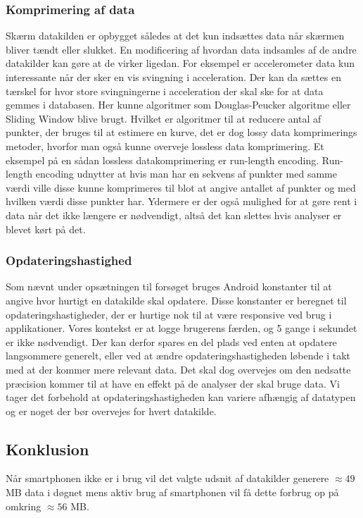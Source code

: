 \subsubsection{Komprimering af data}\label{sec:opryd}
Skærm datakilden er opbygget således at det kun indsættes data når skærmen bliver tændt eller slukket.
En modificering af hvordan data indsamles af de andre datakilder kan gøre at de virker ligedan. 
For eksempel er accelerometer data kun interessante når der sker en vis svingning i acceleration.
Der kan da sættes en tærskel for hvor store svingningerne i acceleration der skal ske for at data gemmes i databasen.
Her kunne algoritmer som Douglas-Peucker algoritme eller Sliding Window blive brugt.
Hvilket er algoritmer til at reducere antal af punkter, der bruges til at estimere en kurve, det er dog lossy data komprimerings metoder, hvorfor man også kunne overveje lossless data komprimering.
Et eksempel på en sådan lossless datakomprimering er run-length encoding\cite{misc:rle}.
Run-length encoding udnytter at hvis man har en sekvens af punkter med samme værdi ville disse kunne komprimeres til blot at angive antallet af punkter og med hvilken værdi disse punkter har.
Ydermere er der også mulighed for at gøre rent i data når det ikke længere er nødvendigt, altså det kan slettes hvis analyser er blevet kørt på det.

\subsubsection{Opdateringshastighed}
Som nævnt under opsætningen til forsøget bruges Android konstanter til at angive hvor hurtigt en datakilde skal opdatere.
Disse konstanter er beregnet til opdateringshastigheder, der er hurtige nok til at være responsive ved brug i applikationer.
Vores kontekst er at logge brugerens færden, og 5 gange i sekundet er ikke nødvendigt.
Der kan derfor spares en del plads ved enten at opdatere langsommere generelt, eller ved at ændre opdateringshastigheden løbende i takt med at der kommer mere relevant data.
Det skal dog overvejes om den nedsatte præcision kommer til at have en effekt på de analyser der skal bruge data.
Vi tager det forbehold at opdateringshastigheden kan variere afhængig af datatypen og er noget der bør overvejes for hvert datakilde.

\subsection{Konklusion}
Når smartphonen ikke er i brug vil det valgte udsnit af datakilder generere $\approx49$ MB data i døgnet mens aktiv brug af smartphonen vil få dette forbrug op på omkring $\approx56$ MB.

